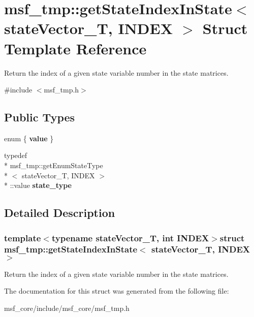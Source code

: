 \hypertarget{structmsf__tmp_1_1getStateIndexInState}{\section{msf\-\_\-tmp\-:\-:get\-State\-Index\-In\-State$<$ state\-Vector\-\_\-\-T, I\-N\-D\-E\-X $>$ Struct Template Reference}
\label{structmsf__tmp_1_1getStateIndexInState}
}


Return the index of a given state variable number in the state matrices.  




{\ttfamily \#include $<$msf\-\_\-tmp.\-h$>$}

\subsection*{Public Types}
\begin{DoxyCompactItemize}
\item 
enum \{ {\bfseries value}
 \}
\item 
\hypertarget{structmsf__tmp_1_1getStateIndexInState_a07ac7bf8d85ca0fa2f6f8313c8110820}{typedef \\*
msf\-\_\-tmp\-::get\-Enum\-State\-Type\\*
$<$ state\-Vector\-\_\-\-T, I\-N\-D\-E\-X $>$\\*
\-::value {\bfseries state\-\_\-type}}\label{structmsf__tmp_1_1getStateIndexInState_a07ac7bf8d85ca0fa2f6f8313c8110820}

\end{DoxyCompactItemize}


\subsection{Detailed Description}
\subsubsection*{template$<$typename state\-Vector\-\_\-\-T, int I\-N\-D\-E\-X$>$struct msf\-\_\-tmp\-::get\-State\-Index\-In\-State$<$ state\-Vector\-\_\-\-T, I\-N\-D\-E\-X $>$}

Return the index of a given state variable number in the state matrices. 

The documentation for this struct was generated from the following file\-:\begin{DoxyCompactItemize}
\item 
msf\-\_\-core/include/msf\-\_\-core/msf\-\_\-tmp.\-h\end{DoxyCompactItemize}
